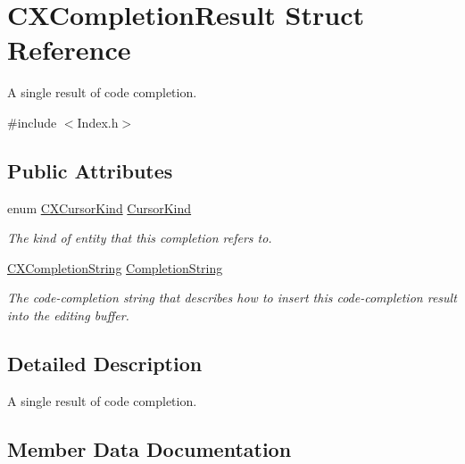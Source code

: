 \hypertarget{structCXCompletionResult}{}\section{C\+X\+Completion\+Result Struct Reference}
\label{structCXCompletionResult}


A single result of code completion.  




{\ttfamily \#include $<$Index.\+h$>$}

\subsection*{Public Attributes}
\begin{DoxyCompactItemize}
\item 
enum \mbox{\hyperlink{group__CINDEX_gaaccc432245b4cd9f2d470913f9ef0013}{C\+X\+Cursor\+Kind}} \mbox{\hyperlink{structCXCompletionResult_adfd21960b683399da375ff0ed10527b7}{Cursor\+Kind}}
\begin{DoxyCompactList}\small\item\em The kind of entity that this completion refers to. \end{DoxyCompactList}\item 
\mbox{\label{structCXCompletionResult_a4576d7df8f0782b9dc6493a68e605c80}} 
\mbox{\hyperlink{group__CINDEX__CODE__COMPLET_gafea23a43a60ec3b4f3bedccfbb76883a}{C\+X\+Completion\+String}} \mbox{\hyperlink{structCXCompletionResult_a4576d7df8f0782b9dc6493a68e605c80}{Completion\+String}}
\begin{DoxyCompactList}\small\item\em The code-\/completion string that describes how to insert this code-\/completion result into the editing buffer. \end{DoxyCompactList}\end{DoxyCompactItemize}


\subsection{Detailed Description}
A single result of code completion. 

\subsection{Member Data Documentation}
\mbox{\label{structCXCompletionResult_adfd21960b683399da375ff0ed10527b7}} 

